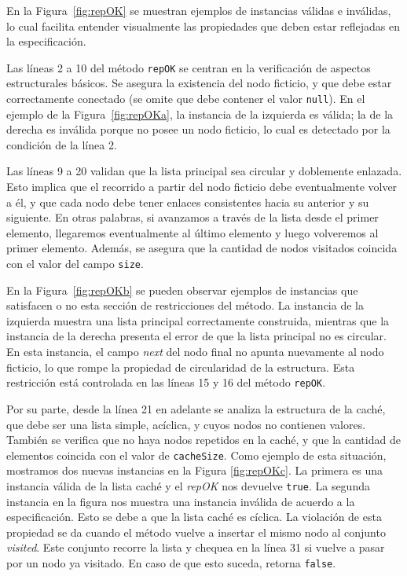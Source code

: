 En la Figura~\ref{fig:repOK} se muestran ejemplos de instancias válidas e inválidas, lo cual facilita entender visualmente las propiedades que deben estar reflejadas en la especificación.

Las líneas 2 a 10 del método \texttt{repOK} se centran en la verificación de aspectos estructurales básicos. Se asegura la existencia del 
nodo ficticio, y que debe estar correctamente conectado (se omite que debe contener el valor
\texttt{null}). 
En el ejemplo de la Figura~\ref{fig:repOKa}, la instancia de la izquierda es
válida; la de la derecha es inválida porque no posee un nodo ficticio, lo cual
es detectado por la condición de la línea 2.

Las líneas 9 a 20 validan que la lista principal sea circular y doblemente enlazada. Esto implica que el recorrido a partir 
del nodo ficticio debe eventualmente volver a él, y que cada nodo debe tener enlaces consistentes hacia su anterior y su 
siguiente. En otras palabras, si avanzamos a través de la lista desde el primer elemento, llegaremos eventualmente al
último elemento y luego volveremos al primer elemento. Además, se asegura que la cantidad de nodos visitados coincida con el valor del campo \texttt{size}.

En la Figura~\ref{fig:repOKb} se pueden observar ejemplos de instancias que satisfacen o no esta sección de restricciones del método.
La instancia de la izquierda muestra una lista principal correctamente construida, mientras que la instancia de la derecha presenta el error de que la lista principal no es circular.  
En esta instancia, el campo \emph{next} del nodo final no apunta nuevamente al nodo ficticio, lo que rompe la propiedad de circularidad de la estructura.  
Esta restricción está controlada en las líneas 15 y 16 del método \texttt{repOK}.

Por su parte, desde la línea 21 en adelante se analiza la estructura de la
caché, que debe ser una lista simple, acíclica, y cuyos nodos 
no contienen valores. También se verifica que no haya nodos repetidos en la caché, y que la 
cantidad de elementos coincida con el valor de \texttt{cacheSize}.
Como ejemplo de esta situación, mostramos dos nuevas instancias en la Figura \ref{fig:repOKc}. 
La primera es una instancia válida de la lista caché y el \emph{repOK} nos devuelve \texttt{true}. 
La segunda instancia en la figura nos muestra una instancia inválida de acuerdo a la especificación. 
Esto se debe a que la lista caché es cíclica. 
La violación de esta propiedad se da cuando el método vuelve a insertar el mismo nodo al conjunto \emph{visited}. 
Este conjunto recorre la lista y chequea en la línea 31 si vuelve a pasar por un nodo ya visitado. 
En caso de que esto suceda, retorna \texttt{false}. 

